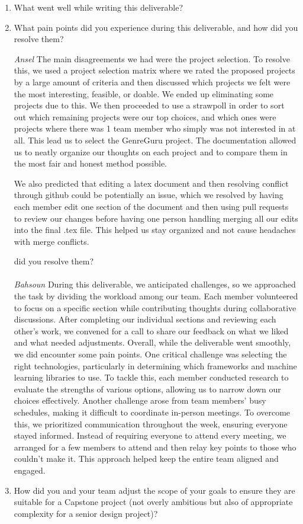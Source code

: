 \documentclass{article}
\begin{document}



\begin{enumerate}
    \item What went well while writing this deliverable? 
    \item What pain points did you experience during this deliverable, and how
    did you resolve them?
    
\emph{Ansel}
The main disagreements we had were the project selection. To resolve this, we used a project selection matrix 
where we rated the proposed projects by a large amount of criteria and then discussed which projects we felt
were the most interesting, feasible, or doable. We ended up eliminating some projects due to this. We then proceeded to use a strawpoll in order to sort out which
remaining projects were our top choices, and which ones were projects where there was 1 team member who simply was not
interested in at all. This lead us to select the GenreGuru project. The documentation allowed us to neatly organize our
thoughts on each project and to compare them in the most fair and honest method possible. 

We also predicted that editing a latex
document and then resolving conflict through github could be potentially an issue, which we resolved by having each member 
edit one section of the document and then using pull requests to review our changes before having one person handling merging
all our edits into the final .tex file. This helped us stay organized and not cause headaches with merge conflicts. 

    did you resolve them? \\ \\
    \emph{Bahsoun}
    During this deliverable, we anticipated challenges, so we approached the task by dividing the workload among our team. Each member volunteered to focus on a specific section while contributing thoughts during collaborative discussions. After completing our individual sections and reviewing each other's work, we convened for a call to share our feedback on what we liked and what needed adjustments. Overall, while the deliverable went smoothly, we did encounter some pain points. One critical challenge was selecting the right technologies, particularly in determining which frameworks and machine learning libraries to use. To tackle this, each member conducted research to evaluate the strengths of various options, allowing us to narrow down our choices effectively. Another challenge arose from team members' busy schedules, making it difficult to coordinate in-person meetings. To overcome this, we prioritized communication throughout the week, ensuring everyone stayed informed. Instead of requiring everyone to attend every meeting, we arranged for a few members to attend and then relay key points to those who couldn't make it. This approach helped keep the entire team aligned and engaged.

    \item How did you and your team adjust the scope of your goals to ensure
    they are suitable for a Capstone project (not overly ambitious but also of
    appropriate complexity for a senior design project)?
\end{enumerate}  
\end{document}
